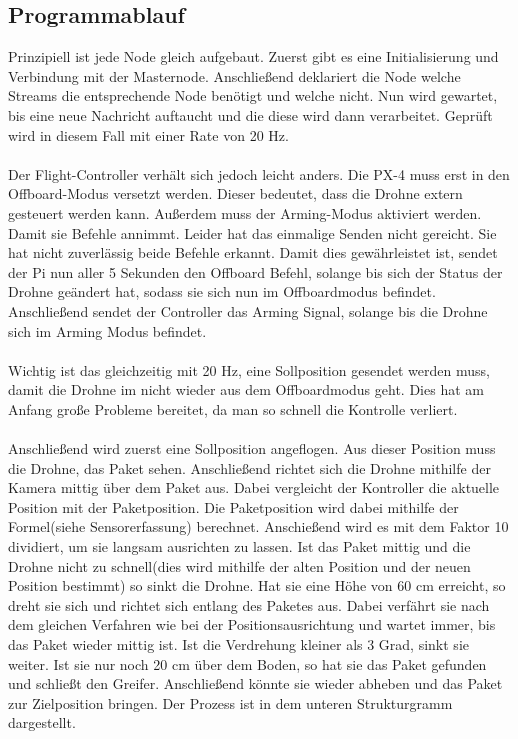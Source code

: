 \subsection{Programmablauf}
Prinzipiell ist jede Node gleich aufgebaut. Zuerst gibt es eine Initialisierung und Verbindung mit der Masternode. Anschließend deklariert die Node welche Streams die entsprechende Node benötigt und welche nicht. Nun wird gewartet, bis eine neue Nachricht auftaucht und die diese wird dann verarbeitet. Geprüft wird in diesem Fall mit einer Rate von 20 Hz. \\
\\
Der Flight-Controller verhält sich jedoch leicht anders. Die PX-4 muss erst in den Offboard-Modus versetzt werden. Dieser bedeutet, dass die Drohne extern gesteuert werden kann. Außerdem muss der Arming-Modus aktiviert werden. Damit sie Befehle annimmt. Leider hat das einmalige Senden nicht gereicht. Sie hat nicht zuverlässig beide Befehle erkannt. Damit dies gewährleistet ist, sendet der Pi nun aller 5 Sekunden den Offboard Befehl, solange bis sich der Status der Drohne geändert hat, sodass sie sich nun im Offboardmodus befindet. Anschließend sendet der Controller das Arming Signal, solange bis die Drohne sich im Arming Modus befindet.\\
\\
Wichtig ist das gleichzeitig mit 20 Hz, eine Sollposition gesendet werden muss, damit die Drohne im nicht wieder aus dem Offboardmodus geht. Dies hat am Anfang große Probleme bereitet, da man so schnell die Kontrolle verliert.\\
\\
Anschließend wird zuerst eine Sollposition angeflogen. Aus dieser Position muss die Drohne, das Paket sehen. Anschließend richtet sich die Drohne mithilfe der Kamera mittig über dem Paket aus. Dabei vergleicht der Kontroller die aktuelle Position mit der Paketposition. Die Paketposition wird dabei mithilfe der Formel(siehe Sensorerfassung) berechnet. Anschießend wird es mit dem Faktor 10 dividiert, um sie langsam ausrichten zu lassen. Ist das Paket mittig und die Drohne nicht zu schnell(dies wird mithilfe der alten Position und der neuen Position bestimmt) so sinkt die Drohne. Hat sie eine Höhe von 60 cm erreicht, so dreht sie sich und richtet sich entlang des Paketes aus. Dabei verfährt sie nach dem gleichen Verfahren wie bei der Positionsausrichtung und wartet immer, bis das Paket wieder mittig ist. Ist die Verdrehung kleiner als 3 Grad, sinkt sie weiter. Ist sie nur noch 20 cm über dem Boden, so hat sie das Paket gefunden und schließt den Greifer. Anschließend könnte sie wieder abheben und das Paket zur Zielposition bringen. Der Prozess ist in dem unteren Strukturgramm dargestellt. 

